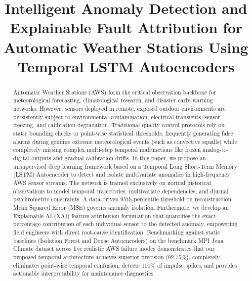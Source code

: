 \documentclass[conference]{IEEEtran}
\begin{document}
\title{Intelligent Anomaly Detection and Explainable Fault Attribution for Automatic Weather Stations Using Temporal LSTM Autoencoders}

\author{
    \and
}

\maketitle

\begin{abstract}
Automatic Weather Stations (AWS) form the critical observation backbone for meteorological forecasting, climatological research, and disaster early-warning networks. However, sensors deployed in remote, exposed outdoor environments are persistently subject to environmental contamination, electrical transients, sensor freezing, and calibration degradation. Traditional quality control protocols rely on static bounding checks or point-wise statistical thresholds, frequently generating false alarms during genuine extreme meteorological events (such as convective squalls) while completely missing complex multi-step temporal malfunctions like frozen analog-to-digital outputs and gradual calibration drifts. In this paper, we propose an unsupervised deep learning framework based on a Temporal Long Short-Term Memory (LSTM) Autoencoder to detect and isolate multivariate anomalies in high-frequency AWS sensor streams. The network is trained exclusively on normal historical observations to model temporal trajectories, multivariate dependencies, and diurnal psychrometric constraints. A data-driven 95th-percentile threshold on reconstruction Mean Squared Error (MSE) governs anomaly isolation. Furthermore, we develop an Explainable AI (XAI) feature attribution formulation that quantifies the exact percentage contribution of each individual sensor to the detected anomaly, empowering field engineers with direct root-cause identification. Benchmarking against static baselines (Isolation Forest and Dense Autoencoders) on the benchmark MPI Jena Climate dataset across five realistic AWS failure modes demonstrates that our proposed temporal architecture achieves superior precision (92.75\%), completely eliminates point-wise temporal confusion, detects 100\% of impulse spikes, and provides actionable interpretability for maintenance diagnostics.
\end{abstract}
\end{document}

